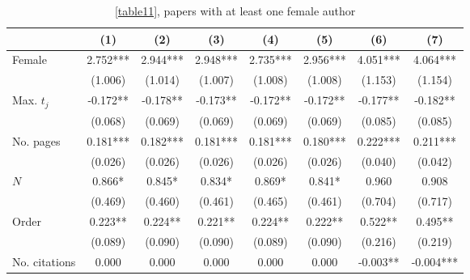 \begin{table}
    \begin{adjustwidth}{-0.085cm}{}
    \footnotesize
    \centering
    \begin{threeparttable}
        \caption{\autoref{table11}, papers with at least one female author}
        \label{table11XB}
        \begin{tabular}{p{2.64cm}SSSSSSS}
            \toprule
            &{(1)}&{(2)}&{(3)}&{(4)}&{(5)}&{(6)}&{(7)}\\
            \midrule
            Female                        &       2.752***&       2.944***&       2.948***&       2.735***&       2.956***&       4.051***&       4.064***\\
                                          &     (1.006)   &     (1.014)   &     (1.007)   &     (1.008)   &     (1.008)   &     (1.153)   &     (1.154)   \\
            Max. \(t_j\)                  &      -0.172** &      -0.178** &      -0.173** &      -0.172** &      -0.172** &      -0.177** &      -0.182** \\
                                          &     (0.068)   &     (0.069)   &     (0.069)   &     (0.069)   &     (0.069)   &     (0.085)   &     (0.085)   \\
            No. pages                     &       0.181***&       0.182***&       0.181***&       0.181***&       0.180***&       0.222***&       0.211***\\
                                          &     (0.026)   &     (0.026)   &     (0.026)   &     (0.026)   &     (0.026)   &     (0.040)   &     (0.042)   \\
            \(N\)                         &       0.866*  &       0.845*  &       0.834*  &       0.869*  &       0.841*  &       0.960   &       0.908   \\
                                          &     (0.469)   &     (0.460)   &     (0.461)   &     (0.465)   &     (0.461)   &     (0.704)   &     (0.717)   \\
            Order                         &       0.223** &       0.224** &       0.221** &       0.224** &       0.222** &       0.522** &       0.495** \\
                                          &     (0.089)   &     (0.090)   &     (0.090)   &     (0.089)   &     (0.090)   &     (0.216)   &     (0.219)   \\
            No. citations                 &       0.000   &       0.000   &       0.000   &       0.000   &       0.000   &      -0.003** &      -0.004***\\

\end{tabular}
\end{threeparttable}
\end{adjustwidth}
\end{table}
